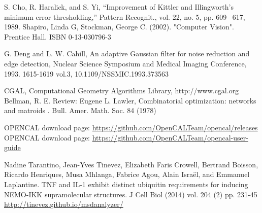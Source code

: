 \documentclass[conference]{IEEEtran}
\begin{document}
%
%
%
\begin{thebibliography}{1}

S. Cho, R. Haralick, and S. Yi, “Improvement of Kittler and Illingworth’s minimum error thresholding,” Pattern Recognit., vol. 22, no. 5, pp. 609– 617, 1989.
Shapiro, Linda G, Stockman, George C. (2002). "Computer Vision". Prentice Hall. ISBN 0-13-030796-3

G. Deng and L. W. Cahill, An adaptive Gaussian filter for noise reduction and edge detection, Nuclear Science Symposium and Medical Imaging Conference, 1993. 1615-1619 vol.3, 10.1109/NSSMIC.1993.373563

CGAL, Computational Geometry Algorithms Library, http://www.cgal.org
Bellman, R. E. Review: Eugene L. Lawler, Combinatorial optimization: networks and matroids . 
 Bull. Amer. Math. Soc. 84 (1978)


OPENCAL download page: \url{https://github.com/OpenCALTeam/opencal/releases}
OPENCAL download page: \url{https://github.com/OpenCALTeam/opencal-user-guide}

Nadine Tarantino, Jean-Yves Tinevez, Elizabeth Faris Crowell, Bertrand Boisson, Ricardo Henriques, Musa Mhlanga, Fabrice Agou, Alain Israël, and Emmanuel Laplantine. TNF and IL-1 exhibit distinct ubiquitin requirements for inducing NEMO-IKK supramolecular structures. J Cell Biol (2014) vol. 204 (2) pp. 231-45
\url{http://tinevez.github.io/msdanalyzer/}
\end{thebibliography}

% 
\end{document}
